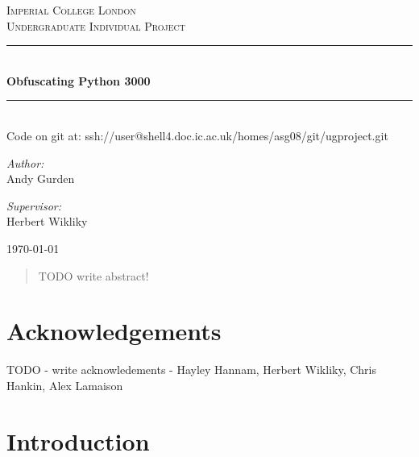 \documentclass{report}
\newcommand{\HRule}{\rule{\linewidth}{0.5mm}}
\begin{document}
\begin{titlepage}

\begin{center}

\textsc{\LARGE Imperial College London}\\[1.5cm]
\textsc{\Large Undergraduate Individual Project}\\[0.5cm]

\HRule \\[0.4cm]
{\huge \bfseries Obfuscating Python 3000} \\[0.4cm]
\HRule \\[0.4cm]

Code on git at: ssh://user@shell4.doc.ic.ac.uk/homes/asg08/git/ugproject.git \\[1.5cm]

\begin{minipage}{0.4\textwidth}
\begin{flushleft} \large
\emph{Author:}\\
Andy Gurden
\end{flushleft}
\end{minipage}
\begin{minipage}{0.4\textwidth}
\begin{flushright} \large
\emph{Supervisor:} \\
Herbert Wikliky
\end{flushright}
\end{minipage}

\vfill

{\large \today}

\end{center}
\end{titlepage}

\begin{abstract}
TODO write abstract!
\end{abstract}

\section*{Acknowledgements}

TODO - write acknowledements - Hayley Hannam, Herbert Wikliky, Chris Hankin, Alex Lamaison

\tableofcontents

\clearpage

\section{Introduction}
\end{document}
